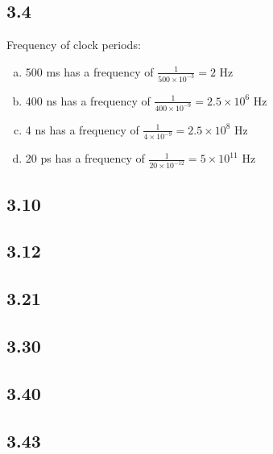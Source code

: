 \documentclass{article}
\begin{document}
\subsection*{3.4}
Frequency of clock periods:
\begin{enumerate}[(a)]
    \item 500 ms has a frequency of $\frac{1}{500 \times 10^{-3}} = 2$ Hz
    \item 400 ns has a frequency of $\frac{1}{400 \times 10^{-9}} = 2.5 \times 10^6$ Hz
    \item 4 ns has a frequency of $\frac{1}{4 \times 10^{-9}} = 2.5 \times 10^8$ Hz
    \item 20 ps has a frequency of $\frac{1}{20 \times 10^{-12}} = 5 \times 10^{11}$ Hz
\end{enumerate}

\subsection*{3.10}

\subsection*{3.12}

\subsection*{3.21}

\subsection*{3.30}

\subsection*{3.40}

\subsection*{3.43}
\end{document}
